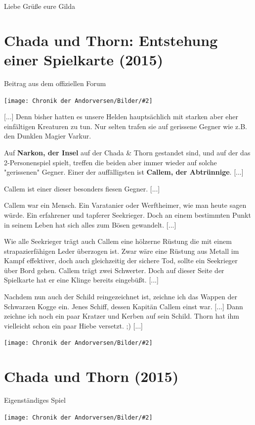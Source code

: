 \documentclass[10pt, a4paper, oneside]{book}
\newcommand{\fillbreak}{\vspace*{\fill}\columnbreak}
\newcommand{\produkt}[1]{%
    \section{#1}%
    \label{Produkt: #1}%
}
\newcommand{\storytext}[1]{%
    \section{#1}%
    \label{Storytext: #1}%
}
\newcommand{\bildmitts}[2][height=0.32\textwidth,width=0.48\textwidth,keepaspectratio]{%
    \begin{center}
        \texttt{[image: Chronik der Andorversen/Bilder/\#2]}
    \end{center}
}
\begin{document}
\begin{multicols}{2}
Liebe Grüße
eure Gilda






\fillbreak
\storytext{Chada und Thorn: Entstehung einer Spielkarte (2015)}

\begin{center}
    Beitrag aus dem offiziellen Forum
\end{center}

\bildmitts{Chada und Thorn Entstehung einer Spielkarte}

[...] Denn bisher hatten es unsere Helden hauptsächlich mit starken aber eher einfältigen Kreaturen zu tun. Nur selten trafen sie auf gerissene Gegner wie z.B. den Dunklen Magier Varkur.

Auf \textbf{Narkon, der Insel} auf der Chada \& Thorn gestandet sind, und auf der das 2-Personenspiel spielt, treffen die beiden aber immer wieder auf solche "gerissenen" Gegner. Einer der auffälligsten ist \textbf{Callem, der Abtrünnige}. [...]

Callem ist einer dieser besonders fiesen Gegner. [...]

Callem war ein Mensch. Ein Varatanier oder Werftheimer, wie man heute sagen würde. Ein erfahrener und tapferer Seekrieger. Doch an einem bestimmten Punkt in seinem Leben hat sich alles zum Bösen gewandelt. [...]

Wie alle Seekrieger trägt auch Callem eine hölzerne Rüstung die mit einem strapazierfähigen Leder überzogen ist. Zwar wäre eine Rüstung aus Metall im Kampf effektiver, doch auch gleichzeitig der sichere Tod, sollte ein Seekrieger über Bord gehen. Callem trägt zwei Schwerter. Doch auf dieser Seite der Spielkarte hat er eine Klinge bereits eingebüßt. [...]

Nachdem nun auch der Schild reingezeichnet ist, zeichne ich das Wappen der Schwarzen Kogge ein. Jenes Schiff, dessen Kapitän Callem einst war. [...] Dann zeichne ich noch ein paar Kratzer und Kerben auf sein Schild. Thorn hat ihm vielleicht schon ein paar Hiebe versetzt. ;) [...]

\bildmitts{Wallpaper Callem.jpg}







\fillbreak
\produkt{Chada und Thorn (2015)}

\begin{center}
    Eigenständiges Spiel
\end{center}

\bildmitts{Chada und Thorn (2015).png}


\end{multicols}
\end{document}
